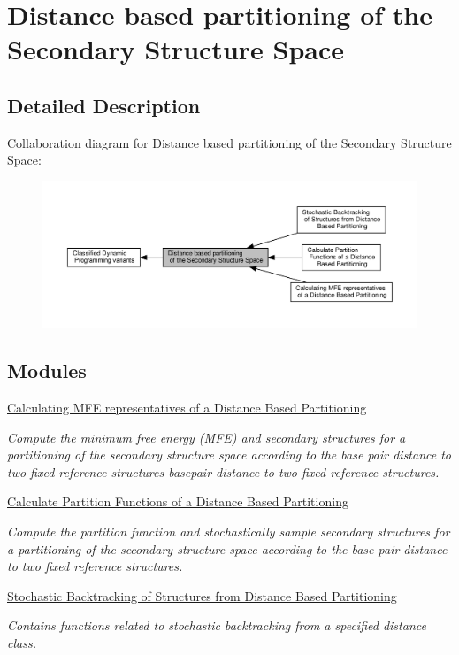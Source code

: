 \hypertarget{group__kl__neighborhood}{}\section{Distance based partitioning of the Secondary Structure Space}
\label{group__kl__neighborhood}


\subsection{Detailed Description}
Collaboration diagram for Distance based partitioning of the Secondary Structure Space\+:
\nopagebreak
\begin{figure}[H]
\begin{center}
\leavevmode
\includegraphics[width=350pt]{group__kl__neighborhood}
\end{center}
\end{figure}
\subsection*{Modules}
\begin{DoxyCompactItemize}
\item 
\hyperlink{group__kl__neighborhood__mfe}{Calculating M\+F\+E representatives of a Distance Based Partitioning}
\begin{DoxyCompactList}\small\item\em Compute the minimum free energy (M\+FE) and secondary structures for a partitioning of the secondary structure space according to the base pair distance to two fixed reference structures basepair distance to two fixed reference structures. \end{DoxyCompactList}\item 
\hyperlink{group__kl__neighborhood__pf}{Calculate Partition Functions of a Distance Based Partitioning}
\begin{DoxyCompactList}\small\item\em Compute the partition function and stochastically sample secondary structures for a partitioning of the secondary structure space according to the base pair distance to two fixed reference structures. \end{DoxyCompactList}\item 
\hyperlink{group__kl__neighborhood__stochbt}{Stochastic Backtracking of Structures from Distance Based Partitioning}
\begin{DoxyCompactList}\small\item\em Contains functions related to stochastic backtracking from a specified distance class. \end{DoxyCompactList}\end{DoxyCompactItemize}
